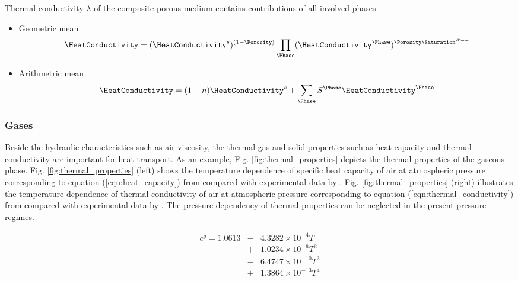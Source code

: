 Thermal conductivity $\lambda$ of the composite porous medium
contains contributions of all involved phases.

\begin{itemize}
	\item Geometric mean
\begin{eqnarray}
\HeatConductivity
=
(\HeatConductivity^s)^{(1-\Porosity)}
\prod_\Phase
(\HeatConductivity^\Phase)^{\Porosity\Saturation^\Phase}
\end{eqnarray}

	\item Arithmetric mean
\begin{eqnarray}
\HeatConductivity
=
(1-n)\HeatConductivity^s
+
\sum_\Phase S^\Phase \HeatConductivity^\Phase
\label{eqn:thermal_conductivity}
\end{eqnarray}

\end{itemize}

\subsubsection{Gases}

Beside the hydraulic characteristics such as air viscosity, the thermal gas and solid properties such as heat capacity and thermal conductivity are important for heat transport.
As an example, Fig. \ref{fig:thermal_properties} depicts the thermal properties of the gaseous phase.
Fig. \ref{fig:thermal_properties} (left) shows the temperature dependence of specific heat capacity of air at atmospheric pressure corresponding to equation (\ref{eqn:heat_capacity}) from \cite{ZografosEtAl:1987} compared with experimental data by \cite{VargaftikEtAl:1996}. Fig. \ref{fig:thermal_properties} (right) illustrates the temperature dependence of thermal conductivity of air at atmospheric pressure corresponding to equation (\ref{eqn:thermal_conductivity}) from \cite{ZografosEtAl:1987} compared with experimental data by \cite{VargaftikEtAl:1996}. The pressure dependency of thermal properties can be neglected in the present pressure regimes.

\begin{eqnarray}
c^g
=
1.0613
&-&
4.3282 \times 10^{-4} T
\nonumber\\
&+&
1.0234 \times 10^{-6} T^2
\nonumber\\
&-&
6.4747 \times 10^{-10} T^3
\nonumber\\
&+&
1.3864 \times 10^{-13} T^4
\label{eqn:heat_capacity}
\end{eqnarray}

